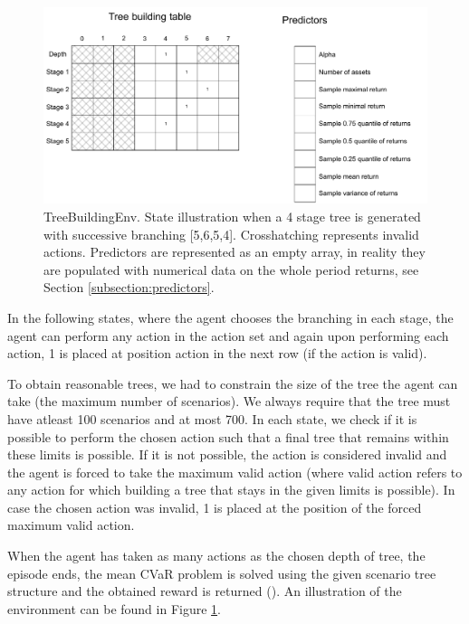 \begin{figure}[H]
  \includegraphics[width=\linewidth]{../img/Treebuildingenv_graph.pdf}
  \caption{TreeBuildingEnv. State illustration when a 4 stage tree is generated with successive branching [5,6,5,4]. Crosshatching represents invalid actions. Predictors are represented as an empty array, in reality they are populated with numerical data on the whole period returns, see Section \ref{subsection:predictors}.}
  \label{fig:treebuildingenv}
\end{figure}


In the following states, where the agent chooses the branching in each stage, the agent can perform any action in the action set and again upon performing each action, 1 is placed at position action in the next row (if the action is valid). 

To obtain reasonable trees, we had to constrain the size of the tree the agent can take (the maximum number of scenarios). We always require that the tree must have atleast 100 scenarios and at most 700. In each state, we check if it is possible to perform the chosen action such that a final tree that remains within these limits is possible. If it is not possible, the action is considered invalid and the agent is forced to take the maximum valid action (where valid action refers to any action for which building a tree that stays in the given limits is possible). In case the chosen action was invalid, 1 is placed at the position of the forced maximum valid action.

When the agent has taken as many actions as the chosen depth of tree, the episode ends, the mean CVaR problem is solved using the given scenario tree structure and the obtained reward is returned (). An illustration of the environment can be found in Figure \ref{fig:treebuildingenv}.

